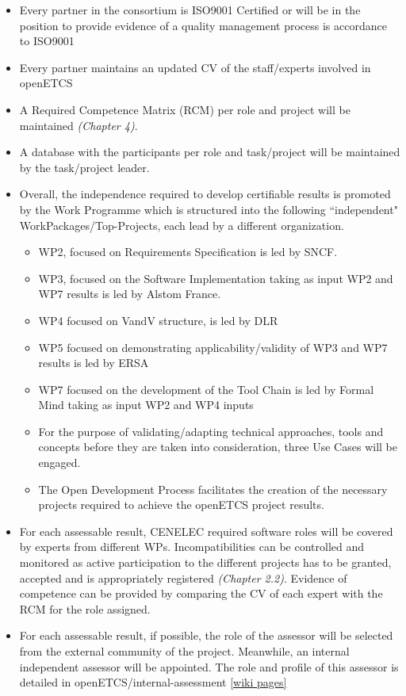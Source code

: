 \documentclass{template/openetcs_article}
\begin{document}
\begin{itemize}
\item Every partner in the consortium is ISO9001 Certified or will be in the position to provide evidence of a quality management process is accordance to ISO9001
\item Every partner maintains an updated CV of the staff/experts involved in openETCS
\item A Required Competence Matrix (RCM) per role and project will be maintained \textit{(Chapter 4)}.
\item A database with the participants per role and task/project will be maintained by the task/project leader.
\item Overall, the independence required to develop certifiable results is promoted by the Work Programme which is structured into the following “independent" WorkPackages/Top-Projects, each lead by a different organization.  
\begin{itemize}
\item WP2, focused on Requirements Specification is led by SNCF.
\item WP3, focused on the Software Implementation taking as input WP2 and WP7 results is led by Alstom France.
\item WP4 focused on \gls{VandV} structure, is led by DLR
\item WP5 focused on demonstrating applicability/validity of WP3 and WP7 results is led by ERSA
\item WP7 focused on the development of the Tool Chain is led by Formal Mind taking as input WP2 and WP4 inputs
\item For the purpose of validating/adapting technical approaches, tools and concepts before they are taken into consideration, three Use Cases will be engaged.
\item The Open Development Process facilitates the creation of the necessary projects required to achieve the openETCS project results.
\end{itemize}
\item For each assessable result, CENELEC required software roles will be covered by experts from different WPs. Incompatibilities can be controlled and monitored as active participation to the different projects has to be granted, accepted and is appropriately registered  \textit{(Chapter 2.2)}. Evidence of competence can be provided by comparing the CV of each expert with the RCM for the role assigned.
\item For each assessable result, if possible, the role of the \gls{assessor} will be selected from the external community of the project. Meanwhile, an internal independent \gls{assessor} will be appointed. The role and profile of this \gls{assessor} is detailed in openETCS/internal-assessment \citep{IA} \href{https://github.com/openETCS/ecosystem/wiki/WP4:-internal-assessment}{[wiki pages]}
\end{itemize}
\end{document}
